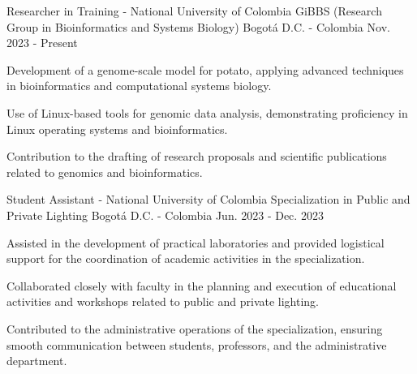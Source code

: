 \begin{cventries}
\cventry
{Researcher in Training - National University of Colombia} %
{GiBBS (Research Group in Bioinformatics and Systems Biology)} %
{Bogotá D.C. - Colombia} %
{Nov. 2023 - Present} %
{ %
\begin{cvitems}
\item {Development of a genome-scale model for potato, applying advanced techniques in bioinformatics and computational systems biology.}
\item {Use of Linux-based tools for genomic data analysis, demonstrating proficiency in Linux operating systems and bioinformatics.}
\item {Contribution to the drafting of research proposals and scientific publications related to genomics and bioinformatics.}
\end{cvitems}
}

\cventry
{Student Assistant - National University of Colombia} %
{Specialization in Public and Private Lighting} %
{Bogotá D.C. - Colombia} %
{Jun. 2023 - Dec. 2023} %
{ %
\begin{cvitems}
\item {Assisted in the development of practical laboratories and provided logistical support for the coordination of academic activities in the specialization.}
\item {Collaborated closely with faculty in the planning and execution of educational activities and workshops related to public and private lighting.}
\item {Contributed to the administrative operations of the specialization, ensuring smooth communication between students, professors, and the administrative department.}
\end{cvitems}
}


\end{cventries}
